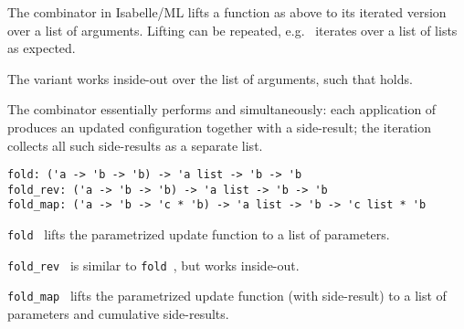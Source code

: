 \begin{isabellebody}
\begin{isamarkuptext}
  The  combinator in Isabelle/ML lifts a function  as above to its iterated version over a list of arguments.
  Lifting can be repeated, e.g.\  iterates
  over a list of lists as expected.

  The variant  works inside-out over the list of
  arguments, such that  holds.

  The  combinator essentially performs  and  simultaneously: each application of  produces an updated configuration together with a side-result;
  the iteration collects all such side-results as a separate list.%
\end{isamarkuptext}%
\isamarkuptrue%
%
\isadelimmlref
%
\endisadelimmlref
%
\isatagmlref
%
\begin{isamarkuptext}%
\begin{mldecls}
  \verb|fold: ('a -> 'b -> 'b) -> 'a list -> 'b -> 'b| \\
  \verb|fold_rev: ('a -> 'b -> 'b) -> 'a list -> 'b -> 'b| \\
  \verb|fold_map: ('a -> 'b -> 'c * 'b) -> 'a list -> 'b -> 'c list * 'b| \\
  \end{mldecls}

  \begin{description}

  \item \verb|fold|~ lifts the parametrized update function
   to a list of parameters.

  \item \verb|fold_rev|~ is similar to \verb|fold|~, but works inside-out.

  \item \verb|fold_map|~ lifts the parametrized update
  function  (with side-result) to a list of parameters and
  cumulative side-results.

  \end{description}


\end{isamarkuptext}
\end{isabellebody}
